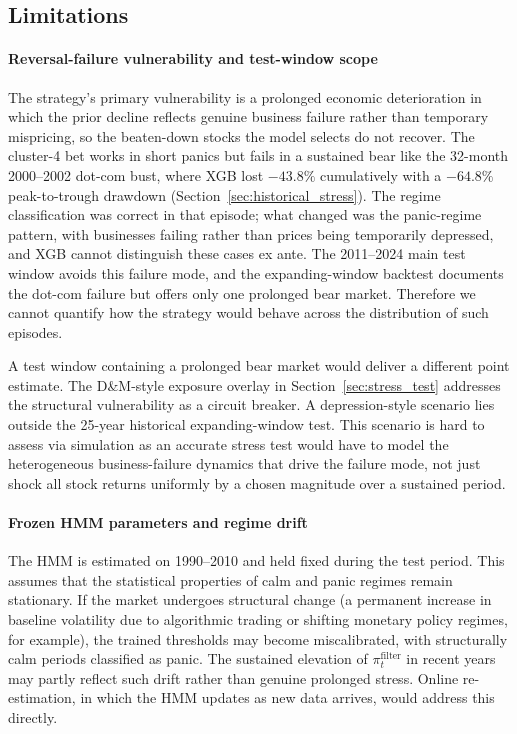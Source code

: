 \subsection{Limitations}\label{sec:limitations}

\paragraph{Reversal-failure vulnerability and test-window scope}
The strategy's primary vulnerability is a prolonged economic deterioration in which the prior decline reflects genuine business failure rather than temporary mispricing, so the beaten-down stocks the model selects do not recover. The cluster-4 bet works in short panics but fails in a sustained bear like the 32-month 2000--2002 dot-com bust, where XGB lost $-43.8\%$ cumulatively with a $-64.8\%$ peak-to-trough drawdown (Section~\ref{sec:historical_stress}). The regime classification was correct in that episode; what changed was the panic-regime pattern, with businesses failing rather than prices being temporarily depressed, and XGB cannot distinguish these cases ex ante. The 2011--2024 main test window avoids this failure mode, and the expanding-window backtest documents the dot-com failure but offers only one prolonged bear market. Therefore we cannot quantify how the strategy would behave across the distribution of such episodes.

A test window containing a prolonged bear market would deliver a different point estimate. The D\&M-style exposure overlay in Section~\ref{sec:stress_test} addresses the structural vulnerability as a circuit breaker. A depression-style scenario lies outside the 25-year historical expanding-window test. This scenario is hard to assess via simulation as an accurate stress test would have to model the heterogeneous business-failure dynamics that drive the failure mode, not just shock all stock returns uniformly by a chosen magnitude over a sustained period.

\bigskip\paragraph{Frozen HMM parameters and regime drift}
The HMM is estimated on 1990--2010 and held fixed during the test period. This assumes that the statistical properties of calm and panic regimes remain stationary. If the market undergoes structural change (a permanent increase in baseline volatility due to algorithmic trading or shifting monetary policy regimes, for example), the trained thresholds may become miscalibrated, with structurally calm periods classified as panic. The sustained elevation of $\pi_t^{\text{filter}}$ in recent years may partly reflect such drift rather than genuine prolonged stress. Online re-estimation, in which the HMM updates as new data arrives, would address this directly.

